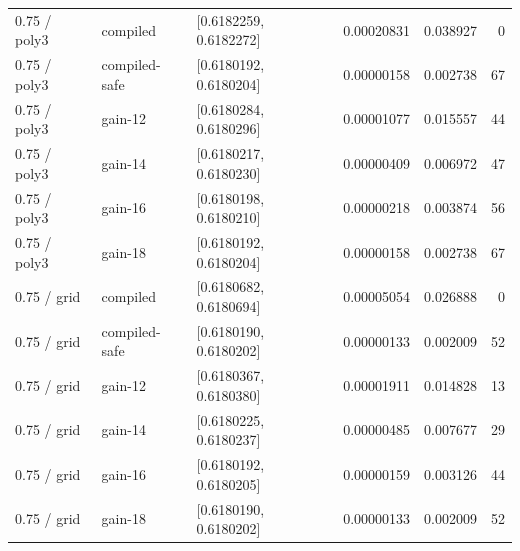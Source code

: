 \begin{longtable}{@{}lllrrr@{}}
0.75 / poly3 & compiled & [0.6182259, 0.6182272] & 0.00020831 & 0.038927 & 0\\
0.75 / poly3 & compiled-safe & [0.6180192, 0.6180204] & 0.00000158 & 0.002738 & 67\\
0.75 / poly3 & gain-12 & [0.6180284, 0.6180296] & 0.00001077 & 0.015557 & 44\\
0.75 / poly3 & gain-14 & [0.6180217, 0.6180230] & 0.00000409 & 0.006972 & 47\\
0.75 / poly3 & gain-16 & [0.6180198, 0.6180210] & 0.00000218 & 0.003874 & 56\\
0.75 / poly3 & gain-18 & [0.6180192, 0.6180204] & 0.00000158 & 0.002738 & 67\\
0.75 / grid & compiled & [0.6180682, 0.6180694] & 0.00005054 & 0.026888 & 0\\
0.75 / grid & compiled-safe & [0.6180190, 0.6180202] & 0.00000133 & 0.002009 & 52\\
0.75 / grid & gain-12 & [0.6180367, 0.6180380] & 0.00001911 & 0.014828 & 13\\
0.75 / grid & gain-14 & [0.6180225, 0.6180237] & 0.00000485 & 0.007677 & 29\\
0.75 / grid & gain-16 & [0.6180192, 0.6180205] & 0.00000159 & 0.003126 & 44\\
0.75 / grid & gain-18 & [0.6180190, 0.6180202] & 0.00000133 & 0.002009 & 52\\
\bottomrule\end{longtable}\endgroup
\begingroup\scriptsize
